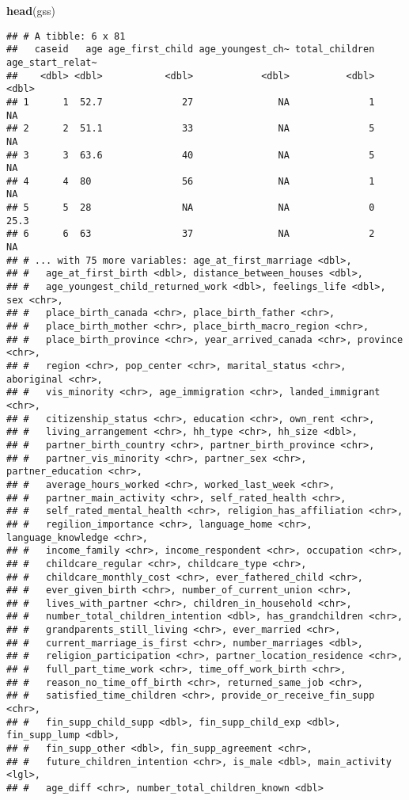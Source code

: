 \documentclass[
]{article}
\newenvironment{Shaded}{\begin{snugshade}}{\end{snugshade}}
\newcommand{\KeywordTok}[1]{\textcolor[rgb]{0.13,0.29,0.53}{\textbf{#1}}}
\newcommand{\NormalTok}[1]{#1}
\begin{document}
\begin{Shaded}
\begin{Highlighting}[]
\KeywordTok{head}\NormalTok{(gss)}
\end{Highlighting}
\end{Shaded}

\begin{verbatim}
## # A tibble: 6 x 81
##   caseid   age age_first_child age_youngest_ch~ total_children age_start_relat~
##    <dbl> <dbl>           <dbl>            <dbl>          <dbl>            <dbl>
## 1      1  52.7              27               NA              1             NA  
## 2      2  51.1              33               NA              5             NA  
## 3      3  63.6              40               NA              5             NA  
## 4      4  80                56               NA              1             NA  
## 5      5  28                NA               NA              0             25.3
## 6      6  63                37               NA              2             NA  
## # ... with 75 more variables: age_at_first_marriage <dbl>,
## #   age_at_first_birth <dbl>, distance_between_houses <dbl>,
## #   age_youngest_child_returned_work <dbl>, feelings_life <dbl>, sex <chr>,
## #   place_birth_canada <chr>, place_birth_father <chr>,
## #   place_birth_mother <chr>, place_birth_macro_region <chr>,
## #   place_birth_province <chr>, year_arrived_canada <chr>, province <chr>,
## #   region <chr>, pop_center <chr>, marital_status <chr>, aboriginal <chr>,
## #   vis_minority <chr>, age_immigration <chr>, landed_immigrant <chr>,
## #   citizenship_status <chr>, education <chr>, own_rent <chr>,
## #   living_arrangement <chr>, hh_type <chr>, hh_size <dbl>,
## #   partner_birth_country <chr>, partner_birth_province <chr>,
## #   partner_vis_minority <chr>, partner_sex <chr>, partner_education <chr>,
## #   average_hours_worked <chr>, worked_last_week <chr>,
## #   partner_main_activity <chr>, self_rated_health <chr>,
## #   self_rated_mental_health <chr>, religion_has_affiliation <chr>,
## #   regilion_importance <chr>, language_home <chr>, language_knowledge <chr>,
## #   income_family <chr>, income_respondent <chr>, occupation <chr>,
## #   childcare_regular <chr>, childcare_type <chr>,
## #   childcare_monthly_cost <chr>, ever_fathered_child <chr>,
## #   ever_given_birth <chr>, number_of_current_union <chr>,
## #   lives_with_partner <chr>, children_in_household <chr>,
## #   number_total_children_intention <dbl>, has_grandchildren <chr>,
## #   grandparents_still_living <chr>, ever_married <chr>,
## #   current_marriage_is_first <chr>, number_marriages <dbl>,
## #   religion_participation <chr>, partner_location_residence <chr>,
## #   full_part_time_work <chr>, time_off_work_birth <chr>,
## #   reason_no_time_off_birth <chr>, returned_same_job <chr>,
## #   satisfied_time_children <chr>, provide_or_receive_fin_supp <chr>,
## #   fin_supp_child_supp <dbl>, fin_supp_child_exp <dbl>, fin_supp_lump <dbl>,
## #   fin_supp_other <dbl>, fin_supp_agreement <chr>,
## #   future_children_intention <chr>, is_male <dbl>, main_activity <lgl>,
## #   age_diff <chr>, number_total_children_known <dbl>
\end{verbatim}
\end{document}

